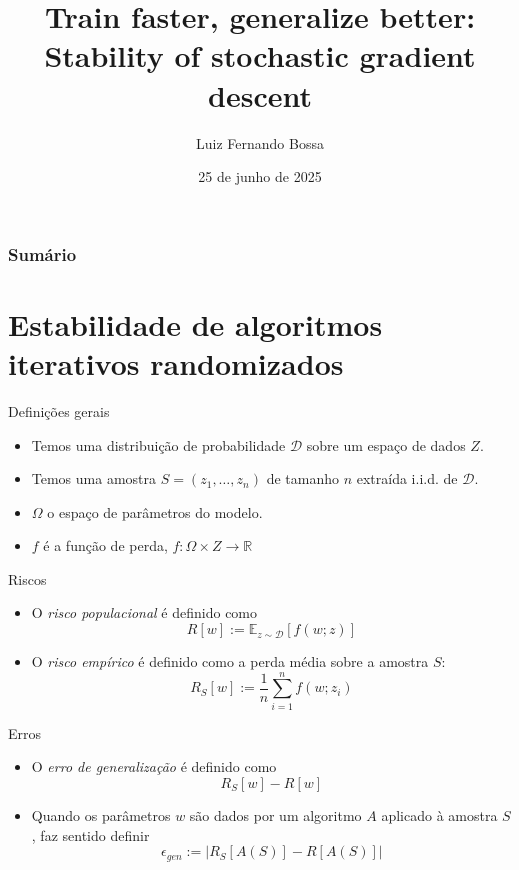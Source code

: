 \documentclass{beamer}
\title{Train faster, generalize better: Stability of stochastic gradient descent}
\author{Luiz Fernando Bossa}
\date{25 de junho de 2025}
\newcommand{\EE}{\mathbb{E}}
\begin{document}
\begin{frame}
\titlepage
\end{frame}

\begin{frame}
\frametitle{Sumário}
\tableofcontents
\end{frame}
 

\section{Estabilidade de algoritmos iterativos randomizados}
\begin{frame}
\tableofcontents[currentsection]
\end{frame}

\begin{frame}{Definições gerais}
    \begin{itemize}
        \item Temos uma distribuição de probabilidade \(\mathcal{D}\) sobre um espaço de dados \(Z\).
        \item Temos uma amostra $S = (z_1, \ldots, z_n)$ de tamanho \(n\) extraída i.i.d. de \(\mathcal{D}\).
        \item $\Omega$ o espaço de parâmetros do modelo.
        \item $f$ é a função de perda, $f:\Omega\times Z\rightarrow\mathbb{R}$
    \end{itemize}
\end{frame}


\begin{frame}{Riscos}
    \begin{itemize}
        \item O \emph{risco populacional} é definido como
        \begin{equation*}
            R[w] := \EE_{z\sim\mathcal{D}}[f(w;z)]
        \end{equation*}
        \item O \emph{risco empírico} é definido como a perda média sobre a amostra \(S\):
        \begin{equation*}
            R_{S}[w] := \frac{1}{n}\sum_{i=1}^{n}f(w;z_{i})
        \end{equation*}
    \end{itemize}
\end{frame}

\begin{frame}{Erros}
    \begin{itemize} 
    \item O \emph{erro de generalização} é definido como
         \begin{equation*}
            R_{S}[w] - R[w]
        \end{equation*}
        \item Quando os parâmetros $w$ são dados por um algoritmo $A$ aplicado à amostra $S$, faz sentido definir
        \begin{equation*}
            \epsilon_{gen}  := |R_{S}[A(S)] - R[A(S)]|
        \end{equation*}
    \end{itemize}
\end{frame}
\end{document}

